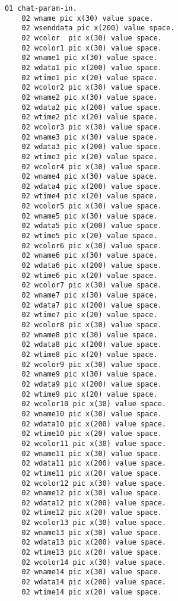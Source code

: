 {{{\begin{verbatim}
      01 chat-param-in.
          02 wname pic x(30) value space.
          02 wsenddata pic x(200) value space.
          02 wcolor  pic x(30) value space.
          02 wcolor1 pic x(30) value space.
          02 wname1 pic x(30) value space.
          02 wdata1 pic x(200) value space.
          02 wtime1 pic x(20) value space.
          02 wcolor2 pic x(30) value space.
          02 wname2 pic x(30) value space.
          02 wdata2 pic x(200) value space.
          02 wtime2 pic x(20) value space.
          02 wcolor3 pic x(30) value space.
          02 wname3 pic x(30) value space.
          02 wdata3 pic x(200) value space.
          02 wtime3 pic x(20) value space.
          02 wcolor4 pic x(30) value space.
          02 wname4 pic x(30) value space.
          02 wdata4 pic x(200) value space.
          02 wtime4 pic x(20) value space.
          02 wcolor5 pic x(30) value space.
          02 wname5 pic x(30) value space.
          02 wdata5 pic x(200) value space.
          02 wtime5 pic x(20) value space.
          02 wcolor6 pic x(30) value space.
          02 wname6 pic x(30) value space.
          02 wdata6 pic x(200) value space.
          02 wtime6 pic x(20) value space.
          02 wcolor7 pic x(30) value space.
          02 wname7 pic x(30) value space.
          02 wdata7 pic x(200) value space.
          02 wtime7 pic x(20) value space.
          02 wcolor8 pic x(30) value space.
          02 wname8 pic x(30) value space.
          02 wdata8 pic x(200) value space.
          02 wtime8 pic x(20) value space.
          02 wcolor9 pic x(30) value space.
          02 wname9 pic x(30) value space.
          02 wdata9 pic x(200) value space.
          02 wtime9 pic x(20) value space.
          02 wcolor10 pic x(30) value space.
          02 wname10 pic x(30) value space.
          02 wdata10 pic x(200) value space.
          02 wtime10 pic x(20) value space.
          02 wcolor11 pic x(30) value space.
          02 wname11 pic x(30) value space.
          02 wdata11 pic x(200) value space.
          02 wtime11 pic x(20) value space.
          02 wcolor12 pic x(30) value space.
          02 wname12 pic x(30) value space.
          02 wdata12 pic x(200) value space.
          02 wtime12 pic x(20) value space.
          02 wcolor13 pic x(30) value space.
          02 wname13 pic x(30) value space.
          02 wdata13 pic x(200) value space.
          02 wtime13 pic x(20) value space.
          02 wcolor14 pic x(30) value space.
          02 wname14 pic x(30) value space.
          02 wdata14 pic x(200) value space.
          02 wtime14 pic x(20) value space.

\end{verbatim}}}}
